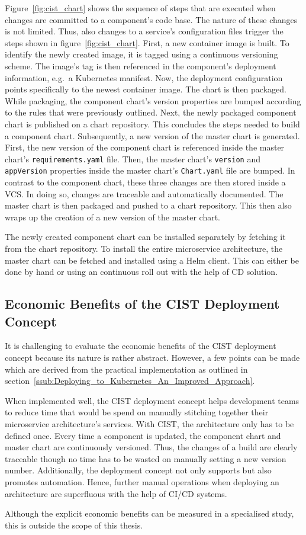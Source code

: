 Figure~\ref{fig:cist_chart} shows the sequence of steps that are executed when
changes are committed to a component's code base. The nature of these changes
is not limited. Thus, also changes to a service's configuration files trigger
the steps shown in figure~\ref{fig:cist_chart}. First, a new container image is
built. To identify the newly created image, it is tagged using a continuous
versioning scheme. The image's tag is then referenced in the component's
deployment information, e.g.\ a Kubernetes manifest. Now, the deployment
configuration points specifically to the newest container image. The chart is
then packaged. While packaging, the component chart's version properties are
bumped according to the rules that were previously outlined. Next, the newly
packaged component chart is published on a chart repository. This concludes the
steps needed to build a component chart. Subsequently, a new version of the
master chart is generated. First, the new version of the component chart is
referenced inside the master chart's \texttt{requirements.yaml} file. Then, the
master chart's \texttt{version} and \texttt{appVersion} properties inside the
master chart's \texttt{Chart.yaml} file are bumped. In contrast to the
component chart, these three changes are then stored inside a \ac{VCS}. In
doing so, changes are traceable and automatically documented. The master chart
is then packaged and pushed to a chart repository. This then also wraps up the
creation of a new version of the master chart.

The newly created component chart can be installed separately by fetching it
from the chart repository. To install the entire microservice architecture, the
master chart can be fetched and installed using a Helm client. This can either
be done by hand or using an continuous roll out with the help of \ac{CD}
solution.

\subsection{Economic Benefits of the \acf{CIST} Deployment Concept}%
\label{sub:Economic_Benefits_of_the_CIST_Deployment_Concept}

It is challenging to evaluate the economic benefits of the \ac{CIST} deployment
concept because its nature is rather abstract. However, a few points can be
made which are derived from the practical implementation as outlined in
section~\ref{ssub:Deploying_to_Kubernetes_An_Improved_Approach}.

When implemented well, the \ac{CIST} deployment concept helps development teams
to reduce time that would be spend on manually stitching together their
microservice architecture's services. With \ac{CIST}, the architecture only has
to be defined once. Every time a component is updated, the component chart and
master chart are continuously versioned. Thus, the changes of a build are
clearly traceable though no time has to be wasted on manually setting a new
version number. Additionally, the deployment concept not only supports but also
promotes automation. Hence, further manual operations when deploying an
architecture are superfluous with the help of \ac{CI}/\ac{CD} systems.

Although the explicit economic benefits can be measured in a specialised study,
this is outside the scope of this thesis.
